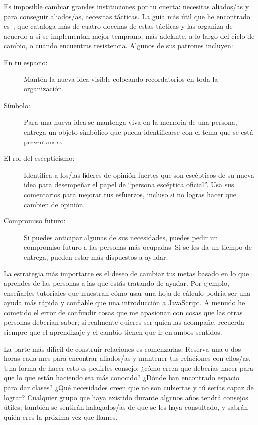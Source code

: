 Es imposible cambiar grandes instituciones por tu cuenta:
necesitas aliados/as
y para conseguir aliados/as,
necesitas tácticas.
La guía más útil que he encontrado es~\cite{Mann2015}, 
que cataloga más de cuatro docenas de estas tácticas
y las organiza de acuerdo a si se implementan mejor temprano,
más adelante,
a lo largo del ciclo de cambio,
o cuando encuentras resistencia.
Algunos de sus patrones incluyen:

\begin{description}

\item[En tu espacio:]
Mantén la nueva idea visible
colocando recordatorios en toda la organización.

\item[Símbolo:] 
Para una nueva idea se mantenga viva en la memoria de una persona,
entrega un objeto simbólico  que pueda identificarse con el tema que se está presentando.

\item[El rol del escepticismo:]
Identifica a los/las líderes de opinión fuertes que son escépticos de su nueva idea para desempeñar el papel de ``persona escéptica oficial''.
Usa sus comentarios para mejorar tus esfuerzos,
incluso si no logras hacer que cambien de opinión.

\item[Compromiso futuro:]
 
Si puedes anticipar algunas de sus necesidades,
puedes pedir un compromiso futuro a las personas más ocupadas.
Si se les da un tiempo de entrega,
pueden estar más dispuestos a ayudar.

\end{description}

La estrategia más importante es
el deseo de cambiar tus metas
basado en lo que aprendes de las personas a las que estás tratando de ayudar.
Por ejemplo, enseñarles tutoriales que muestran cómo usar una hoja de cálculo
podría ser una ayuda más rápida y confiable que 
una introducción a JavaScript.
A menudo he cometido el error de confundir cosas que me apasionan
con cosas que las otras personas deberían saber;
si realmente quieres ser quien las acompañe,
recuerda siempre que el aprendizaje y el cambio tienen que ir en ambos sentidos.

La parte más difícil de construir relaciones es comenzarlas.
Reserva una o dos horas cada mes
para encontrar aliados/as y mantener tus relaciones con ellos/as.
Una forma de hacer esto es pedirles consejo:
¿cómo creen que deberías hacer para que lo que están haciendo sea más conocido?
¿Dónde han encontrado espacio para dar clases?
¿Qué necesidades creen que no son cubiertas
y tú serías capaz de lograr?
Cualquier grupo que haya existido durante algunos años tendrá consejos útiles;
también se sentirán halagados/as de que se les haya consultado,
y sabrán quién eres la próxima vez que llames.


